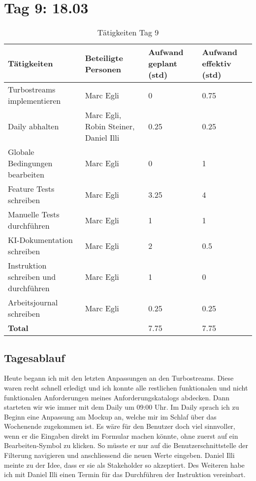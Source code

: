 \section{Tag 9: 18.03}
\begin{table}[H]
    \begin{tabular}{|L{0.4\textwidth}|C{60pt}|C{60pt}|C{60pt}|}
        \hline
        \color{white}Tätigkeiten & \color{white}Beteiligte \color{white}Personen & \color{white}Aufwand geplant (std) & \color{white}Aufwand effektiv (std) \\
        \hline
         Turbostreams implementieren & Marc Egli & 0 & 0.75 \\
        \hline
        Daily abhalten & Marc Egli, Robin Steiner, Daniel Illi & 0.25 & 0.25 \\
        \hline
        Globale Bedingungen bearbeiten & Marc Egli & 0 & 1 \\
        \hline
        Feature Tests schreiben & Marc Egli & 3.25 & 4 \\
        \hline
        Manuelle Tests durchführen & Marc Egli & 1 & 1 \\
        \hline
        KI-Dokumentation schreiben & Marc Egli & 2 & 0.5 \\
        \hline
        Instruktion schreiben und durchführen & Marc Egli & 1 & 0 \\
        \hline
        Arbeitsjournal schreiben & Marc Egli & 0.25 & 0.25 \\
        \hline
        \textbf{Total} &  & 7.75  & 7.75 \\
        \hline
    \end{tabular}
    \caption{Tätigkeiten Tag 9}
\end{table}

\subsection*{Tagesablauf}
Heute begann ich mit den letzten Anpassungen an den Turbostreams. Diese waren recht schnell erledigt und ich konnte alle restlichen funktionalen und nicht
funktionalen Anforderungen meines Anforderungskatalogs abdecken. Dann starteten wir wie immer mit dem Daily um 09:00 Uhr.
Im Daily sprach ich zu Beginn eine Anpassung am Mockup an, welche mir im Schlaf über das Wochenende zugekommen ist. Es wäre für den Benutzer doch viel sinnvoller, 
wenn er die Eingaben direkt im Formular machen könnte, ohne zuerst auf ein Bearbeiten-Symbol zu klicken. So müsste er nur auf die Benutzerschnittstelle der Filterung navigieren
und anschliessend die neuen Werte eingeben. Daniel Illi meinte zu der Idee, dass er sie als Stakeholder so akzeptiert. 
Des Weiteren habe ich mit Daniel Illi einen Termin für das Durchführen der Instruktion vereinbart. 

